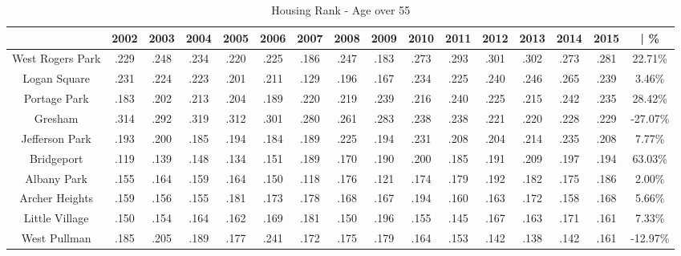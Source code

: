 \documentclass{article}
\theoremstyle{definition}
\theoremstyle{remark}
\begin{document}
\begin{table}[h]\centering
\caption{Housing Rank - Age over 55}\label{thelabel}
\begin{adjustbox}{center}
\begin{tabular}{||c | c c c c c c c c c c c c c c | c ||} 
 \hline
 & 2002 & 2003 & 2004 & 2005 & 2006 & 2007 & 2008 & 2009 & 2010 & 2011 & 2012 & 2013 & 2014 & 2015 & | \%\\[0.5ex] 
 \hline\hline
West Rogers Park & .229 & .248 & .234 & .220 & .225 & .186 & .247 & .183 & .273 & .293 & .301 & .302 & .273 & .281 & 22.71\% \\
Logan Square & .231 & .224 & .223 & .201 & .211 & .129 & .196 & .167 & .234 & .225 & .240 & .246 & .265 & .239 & 3.46\% \\
Portage Park & .183 & .202 & .213 & .204 & .189 & .220 & .219 & .239 & .216 & .240 & .225 & .215 & .242 & .235 & 28.42\% \\
Gresham & .314 & .292 & .319 & .312 & .301 & .280 & .261 & .283 & .238 & .238 & .221 & .220 & .228 & .229 & -27.07\% \\
Jefferson Park & .193 & .200 & .185 & .194 & .184 & .189 & .225 & .194 & .231 & .208 & .204 & .214 & .235 & .208 & 7.77\% \\
Bridgeport & .119 & .139 & .148 & .134 & .151 & .189 & .170 & .190 & .200 & .185 & .191 & .209 & .197 & .194 & 63.03\% \\
Albany Park & .155 & .164 & .159 & .164 & .150 & .118 & .176 & .121 & .174 & .179 & .192 & .182 & .175 & .186 & 2.00\% \\
Archer Heights & .159 & .156 & .155 & .181 & .173 & .178 & .168 & .167 & .194 & .160 & .163 & .172 & .158 & .168 & 5.66\% \\
Little Village & .150 & .154 & .164 & .162 & .169 & .181 & .150 & .196 & .155 & .145 & .167 & .163 & .171 & .161 & 7.33\% \\
West Pullman & .185 & .205 & .189 & .177 & .241 & .172 & .175 & .179 & .164 & .153 & .142 & .138 & .142 & .161 & -12.97\% \\
 \hline
 \end{tabular}

\end{adjustbox}
\end{table}
\end{document}

